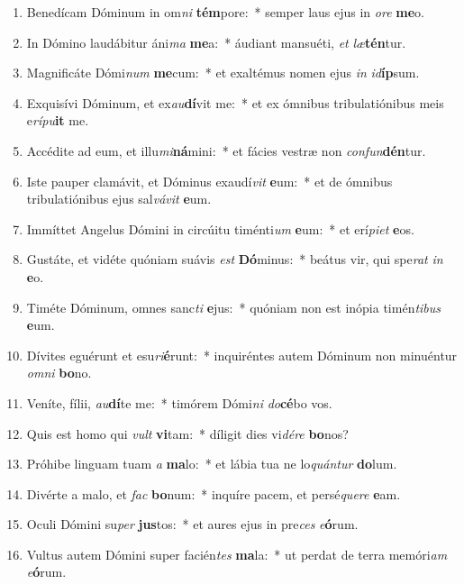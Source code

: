 \documentclass[twoside]{article}
\begin{document}
\begin{paracol}[1]{2}
\begin{enumerate}[wide, itemsep=0mm, labelwidth=!, labelindent=0pt, label=\color{gregoriocolor}\theenumi]
\item Benedícam Dóminum in om\textit{ni} \textbf{tém}pore:~* semper laus ejus in \textit{o}\textit{re} \textbf{me}o.
\item In Dómino laudábitur áni\textit{ma} \textbf{me}a:~* áudiant mansuéti, \textit{et} \textit{læ}\textbf{tén}tur.
\item Magnificáte Dómi\textit{num} \textbf{me}cum:~* et exaltémus nomen ejus \textit{in} \textit{id}\textbf{íp}sum.
\item Exquisívi Dóminum, et ex\textit{au}\textbf{dí}vit me:~* et ex ómnibus tribulatiónibus meis e\textit{rí}\textit{pu}\textbf{it} me.
\item Accédite ad eum, et illu\textit{mi}\textbf{ná}mini:~* et fácies vestræ non \textit{con}\textit{fun}\textbf{dén}tur.
\item Iste pauper clamávit, et Dóminus exaudí\textit{vit} \textbf{e}um:~* et de ómnibus tribulatiónibus ejus sal\textit{vá}\textit{vit} \textbf{e}um.
\item Immíttet Angelus Dómini in circúitu timénti\textit{um} \textbf{e}um:~* et erí\textit{pi}\textit{et} \textbf{e}os.
\item Gustáte, et vidéte quóniam suávis \textit{est} \textbf{Dó}minus:~* beátus vir, qui spe\textit{rat} \textit{in} \textbf{e}o.
\item Timéte Dóminum, omnes sanc\textit{ti} \textbf{e}jus:~* quóniam non est inópia timén\textit{ti}\textit{bus} \textbf{e}um.
\item Dívites eguérunt et esu\textit{ri}\textbf{é}runt:~* inquiréntes autem Dóminum non minuéntur \textit{om}\textit{ni} \textbf{bo}no.
\item Veníte, fílii, \textit{au}\textbf{dí}te me:~* timórem Dómi\textit{ni} \textit{do}\textbf{cé}bo vos.
\item Quis est homo qui \textit{vult} \textbf{vi}tam:~* díligit dies vi\textit{dé}\textit{re} \textbf{bo}nos?
\item Próhibe linguam tuam \textit{a} \textbf{ma}lo:~* et lábia tua ne lo\textit{quán}\textit{tur} \textbf{do}lum.
\item Divérte a malo, et \textit{fac} \textbf{bo}num:~* inquíre pacem, et persé\textit{que}\textit{re} \textbf{e}am.
\item Oculi Dómini su\textit{per} \textbf{jus}tos:~* et aures ejus in pre\textit{ces} \textit{e}\textbf{ó}rum.
\item Vultus autem Dómini super facién\textit{tes} \textbf{ma}la:~* ut perdat de terra memóri\textit{am} \textit{e}\textbf{ó}rum.

\end{enumerate}
\end{paracol}
\end{document}
